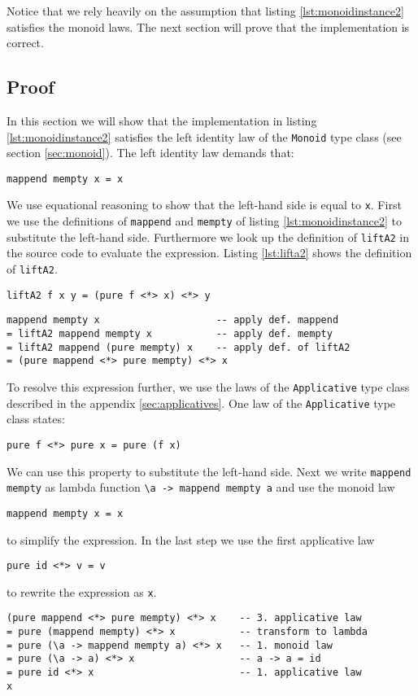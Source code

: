 Notice that we rely heavily on the assumption that listing \ref{lst:monoidinstance2} satisfies the monoid laws. The next section will prove that the implementation is correct.

\subsection{Proof}
\label{sec:exampleproof}

In this section we will show that the implementation in listing \ref{lst:monoidinstance2} satisfies the left identity law of the \verb|Monoid| type class (see section \ref{sec:monoid}).
The left identity law demands that:
\begin{verbatim}
mappend mempty x = x
\end{verbatim}

We use equational reasoning to show that the left-hand side is equal to \verb|x|. First we use the definitions of \verb|mappend| and \verb|mempty| of listing \ref{lst:monoidinstance2} to substitute the left-hand side. Furthermore we look up the definition of \verb|liftA2| in the source code \cite{control.applicative} to evaluate the expression. 
Listing \ref{lst:lifta2} shows the definition of \verb|liftA2|.

\begin{lstlisting}[caption={Function definition of {\ttfamily liftA2}},label={lst:lifta2}]
liftA2 f x y = (pure f <*> x) <*> y
\end{lstlisting}

\begin{verbatim}
mappend mempty x                    -- apply def. mappend
= liftA2 mappend mempty x           -- apply def. mempty
= liftA2 mappend (pure mempty) x    -- apply def. of liftA2
= (pure mappend <*> pure mempty) <*> x
\end{verbatim}

To resolve this expression further, we use the laws of the \verb|Applicative| type class described in the appendix \ref{sec:applicatives}.
One law of the \verb|Applicative| type class states:
\begin{verbatim}
pure f <*> pure x = pure (f x)
\end{verbatim}
We can use this property to substitute the left-hand side. Next we write \verb|mappend mempty| as lambda function \verb|\a -> mappend mempty a| and use the monoid law
\begin{verbatim}
mappend mempty x = x
\end{verbatim}
to simplify the expression. In the last step we use the first applicative law
\begin{verbatim}
pure id <*> v = v
\end{verbatim}
 to rewrite the expression as \verb|x|.
\begin{verbatim}
(pure mappend <*> pure mempty) <*> x    -- 3. applicative law
= pure (mappend mempty) <*> x           -- transform to lambda
= pure (\a -> mappend mempty a) <*> x   -- 1. monoid law 
= pure (\a -> a) <*> x                  -- a -> a = id
= pure id <*> x                         -- 1. applicative law
x
\end{verbatim}


